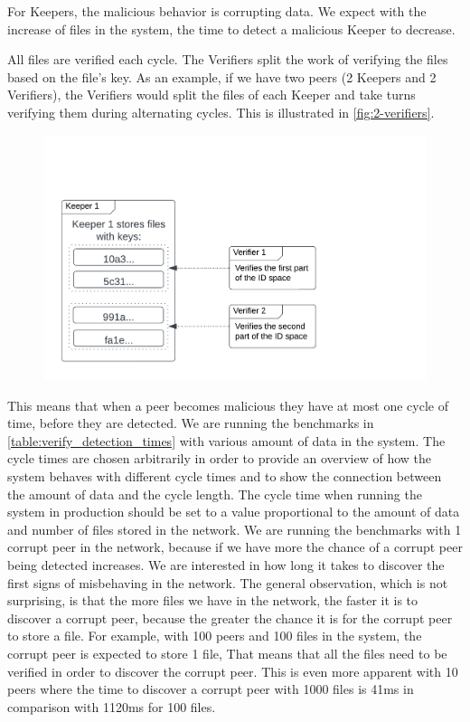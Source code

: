 For Keepers, the malicious behavior is corrupting data.
We expect with the increase of files in the system, the time to detect a malicious Keeper to decrease.

All files are verified each cycle.
The Verifiers split the work of verifying the files based on the file's key.
As an example, if we have two peers (2 Keepers and 2 Verifiers),
the Verifiers would split the files of each Keeper and take turns verifying them
during alternating cycles.
This is illustrated in \autoref{fig:2-verifiers}.

\begin{figure}
    \centering
    \includegraphics[width=350pt]{gfx/2-verifiers.png}
    \label{fig:2-verifiers}
\end{figure}

This means that when a peer becomes malicious they have at most one cycle of time,
before they are detected.
We are running the benchmarks in \autoref{table:verify_detection_times} with various amount of data in the system.
The cycle times are chosen arbitrarily in order to provide an overview of how the system behaves with
different cycle times and to show the connection between the amount of data and the cycle length.
The cycle time when running the system in production should be set to a value proportional to
the amount of data and number of files stored in the network.
We are running the benchmarks with 1 corrupt peer in the network,
because if we have more the chance of a corrupt peer being detected increases.
We are interested in how long it takes to discover the first signs of misbehaving in the network.
The general observation, which is not surprising, is that the more files we have in the network,
the faster it is to discover a corrupt peer,
because the greater the chance it is for the corrupt peer to store a file.
For example, with 100 peers and 100 files in the system, the corrupt peer is expected to store 1 file,
That means that all the files need to be verified in order to discover the corrupt peer.
This is even more apparent with 10 peers where the time to discover a corrupt peer with 1000 files is
41ms in comparison with 1120ms for 100 files.

